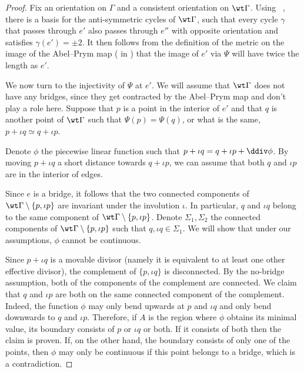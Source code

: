 \begin{proof}

    Fix an orientation on $\Gamma$
 and a  consistent orientation on $\wt\Gamma$.    Using ~\cite[Construction B]{LZ22}, there is a basis for the anti-symmetric cycles of $\wt\Gamma$, such that every cycle $\gamma$ that passes through $e'$ also passes through $e''$ with opposite orientation and satisfies $\gamma(e') = \pm 2$. It then follows from the definition of the metric on the image of the Abel--Prym map  ( in ) that the image of $e'$ via $\Psi$ will have twice the length as $e'$. 
    

We now turn to the  injectivity of $\Psi$ at $e'$. We will assume that $\wt\Gamma$ does not have any bridges, since they get contracted by the Abel--Prym map and don't play a role here. Suppose that $p$ is a point in the interior of $e'$ and that $q$ is another point of $\wt\Gamma$ such that  $\Psi(p) = \Psi(q)$, or what is the same,  $p+\iota q\simeq q+\iota p$. 

Denote $\phi$ the piecewise linear function such that $p+\iota q = q + \iota p + \ddiv\phi$. By moving $p+\iota q$ a short distance towards $q+\iota p$, we can assume that both $q$ and $\iota p$ are in the interior of edges. 


Since   $e$ is a bridge, it follows that the two connected components of $\wt\Gamma\setminus\{p,\iota p\}$ are invariant under the involution $\iota$. In particular, $q$ and $\iota q$ belong to the same component of $\wt\Gamma\setminus\{p,\iota p\}$.
Denote $\Sigma_1,\Sigma_2$ the connected components of $\wt\Gamma\setminus\{p,\iota p\}$ such that $q,\iota q\in\Sigma_1$. We will show that under our assumptions, $\phi$ cannot be continuous. 



 
Since $p + \iota q$  is a movable divisor (namely it is equivalent to at least one other effective divisor), the complement of $\{p,\iota q\}$  is disconnected. By the no-bridge assumption, both of the components of the complement are connected. 
We claim that $q$ and $\iota p$ are both on the same  connected component of the complement. 
Indeed, the function $\phi$ may only bend upwards at $p$ and $\iota q$ and only bend downwards to $q$ and $\iota p$. Therefore, if $A$ is the region where $\phi$  obtains its minimal value, its boundary consists of $p$ or $\iota q$ or both. If it consists of both then the claim is proven. 
If, on the other hand, the boundary consists of only one of the points, then $\phi$ may only be continuous if this point belongs to a bridge, which is a contradiction. 


\end{proof}
